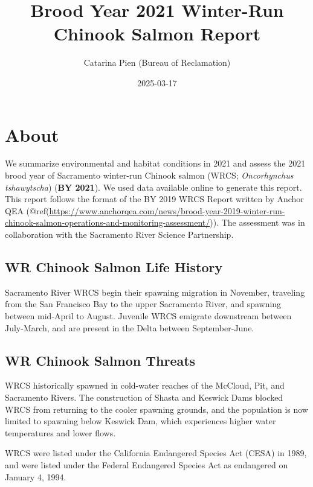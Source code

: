 \documentclass[
]{book}
\title{Brood Year 2021 Winter-Run Chinook Salmon Report}
\author{Catarina Pien (Bureau of Reclamation)}
\date{2025-03-17}
\theoremstyle{definition}
\theoremstyle{definition}
\theoremstyle{definition}
\theoremstyle{definition}
\theoremstyle{remark}
\begin{document}
\maketitle

{
\setcounter{tocdepth}{1}
\tableofcontents
}
\hypertarget{about}{%
\chapter{About}\label{about}}

We summarize environmental and habitat conditions in 2021 and assess the 2021 brood year of Sacramento winter-run Chinook salmon (WRCS; \emph{Oncorhynchus tshawytscha}) (\textbf{BY 2021}). We used data available online to generate this report. This report follows the format of the BY 2019 WRCS Report written by Anchor QEA (@ref(\url{https://www.anchorqea.com/news/brood-year-2019-winter-run-chinook-salmon-operations-and-monitoring-assessment/})). The assessment was in collaboration with the Sacramento River Science Partnership.

\hypertarget{wr-chinook-salmon-life-history}{%
\section{WR Chinook Salmon Life History}\label{wr-chinook-salmon-life-history}}

Sacramento River WRCS begin their spawning migration in November, traveling from the San Francisco Bay to the upper Sacramento River, and spawning between mid-April to August. Juvenile WRCS emigrate downstream between July-March, and are present in the Delta between September-June.

\hypertarget{wr-chinook-salmon-threats}{%
\section{WR Chinook Salmon Threats}\label{wr-chinook-salmon-threats}}

WRCS historically spawned in cold-water reaches of the McCloud, Pit, and Sacramento Rivers. The construction of Shasta and Keswick Dams blocked WRCS from returning to the cooler spawning grounds, and the population is now limited to spawning below Keswick Dam, which experiences higher water temperatures and lower flows.

WRCS were listed under the California Endangered Species Act (CESA) in 1989, and were listed under the Federal Endangered Species Act as endangered on January 4, 1994.
\end{document}

